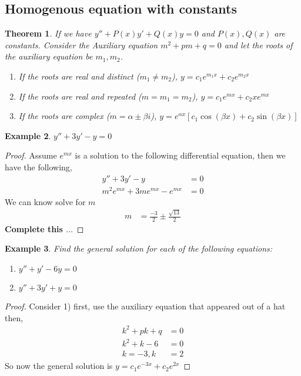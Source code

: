 \documentclass[oneside,11pt,pdftex,final]{book}%
\numberwithin{equation}{section}
\newtheorem{theorem}{Theorem}[chapter]%
\newtheorem{example}[theorem]{Example}
\numberwithin{section}{chapter}
\numberwithin{equation}{chapter}
\begin{document}
\subsection{Homogenous equation with constants}
\begin{theorem}
	If we have $ y''+P(x) y'+Q(x)y=0$ and $ P(x) ,Q(x)$ are constants. Consider the Auxiliary equation $ m^2+pm+q=0 $ and let the roots of the auxiliary equation be $ m_1, m_2 $.
	\begin{enumerate}
		\item If the roots are real and distinct ($ m_1\neq m_2 $), $ y=c_1e^{m_1x}+c_2e^{m_2x} $
		\item If the roots are real and repeated ($ m=m_1=m_2 $), $ y=c_1e^{mx}+c_2xe^{mx} $
		\item If the roots are complex ($ m=\alpha\pm \beta i $), $ y=e^{\alpha x}[c_1 \cos (\beta x)+c_2 \sin (\beta x)] $
	\end{enumerate}
\end{theorem}

\begin{example}
	$ y''+3y'-y=0 $
\end{example}
\begin{proof}
	Assume $ e^{mx} $ is a solution to the following differential equation, then we have the following,
	\begin{align*}
		y''+3y'-y&=0\\
		m^2 e^{mx}+ 3m e^{mx}-e^{mx}&=0
	\end{align*}
We can know solve for $ m $
	\begin{align*}
		m&= \frac{-3}{2}\pm\frac{\sqrt{13}}{2}
	\end{align*}
\textbf{Complete this $\dots$}
\end{proof}


\begin{example}
	Find the general solution for each of the following equations:
	\begin{enumerate}
		\item $ y''+y'-6y=0 $
		\item $ y''+3y'+y=0$
	\end{enumerate}
\end{example}
\begin{proof}
	Consider 1) first,
	use the auxiliary equation that appeared out of a hat then,
	\begin{align*}
		k^2+pk+q&=0\\
		k^2+k-6&=0\\
		k=-3, k&=2
	\end{align*}
	So now the general solution is $ y=c_1e^{-3x}+c_2e^{2x} $
	
\end{proof}
\end{document}

